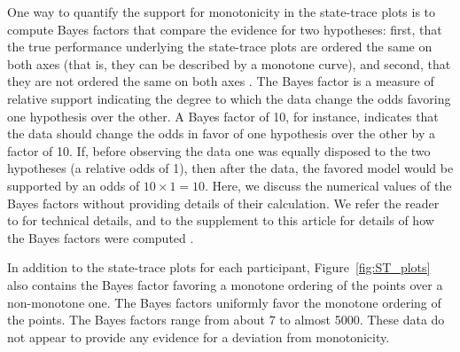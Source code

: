 One way to quantify the support for monotonicity in the state-trace plots is to compute Bayes factors that compare the evidence for two hypotheses: first, that the true performance underlying the state-trace plots are ordered the same on both axes (that is, they can be described by a monotone curve), and second, that they are not ordered the same on both axes \citep{Prince:etal:2012}. The Bayes factor is a measure of relative support indicating the degree to which the data change the odds favoring one hypothesis over the other. A Bayes factor of 10, for instance, indicates that the data should change the odds in favor of one hypothesis over the other by a factor of 10. If, before observing the data one was equally disposed to the two hypotheses (a relative odds of 1), then after the data, the favored model would be supported by an odds of $10 \times 1 = 10$.  Here, we discuss the numerical values of the Bayes factors without providing details of their calculation. We refer the reader to \citet{Prince:etal:2012} for technical details, and to the supplement to this article for details of how the Bayes factors were computed \citep[see also][]{Davis-Stober:etal:inpress}.

In addition to the state-trace plots for each participant, Figure~\ref{fig:ST_plots} also contains the Bayes factor favoring a monotone ordering of the points over a non-monotone one. The Bayes factors uniformly favor the monotone ordering of the points. The Bayes factors range from about 7 to almost 5000. These data do not appear to provide any evidence for a deviation from monotonicity.